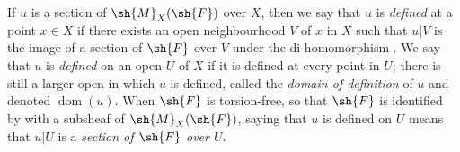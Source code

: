 \begin{env}[20.1.7]
\label{IV.20.1.7}
If $u$ is a section of $\sh{M}_X(\sh{F})$ over $X$, then we say that $u$ is \emph{defined} at a point $x\in X$ if there exists an open neighbourhood $V$ of $x$ in $X$ such that $u|V$ is the image of a section of $\sh{F}$ over $V$ under the di-homomorphism .
We say that $u$ is \emph{defined} on an open $U$ of $X$ if it is defined at every point in $U$;
there is still a larger open in which $u$ is defined, called the \emph{domain of definition} of $u$ and denoted $\operatorname{dom}(u)$.
When $\sh{F}$ is torsion-free, so that $\sh{F}$ is identified by  with a subsheaf of $\sh{M}_X(\sh{F})$, saying that $u$ is defined on $U$ means that $u|U$ is a \emph{section of $\sh{F}$ over $U$}.
\end{env}

